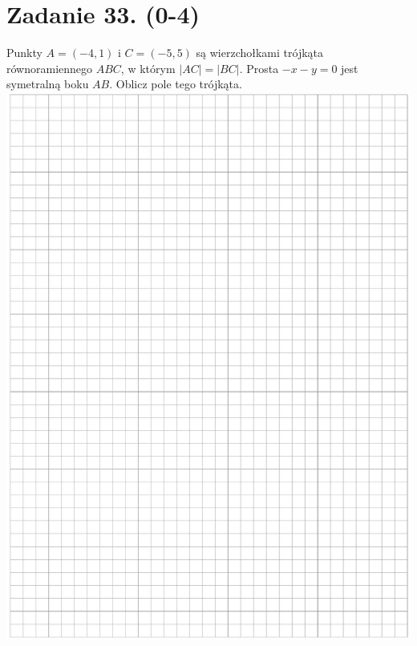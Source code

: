 \documentclass[10pt]{article}
\begin{document}
\section*{Zadanie 33. (0-4)}
Punkty \(A=(-4,1)\) i \(C=(-5,5)\) są wierzchołkami trójkąta równoramiennego \(A B C\), w którym \(|A C|=|B C|\). Prosta \(-x-y=0\) jest symetralną boku \(A B\). Oblicz pole tego trójkąta.\\
\includegraphics[max width=\textwidth, center]{2024_11_21_99eb8e6624b497a5af43g-17}
\end{document}
